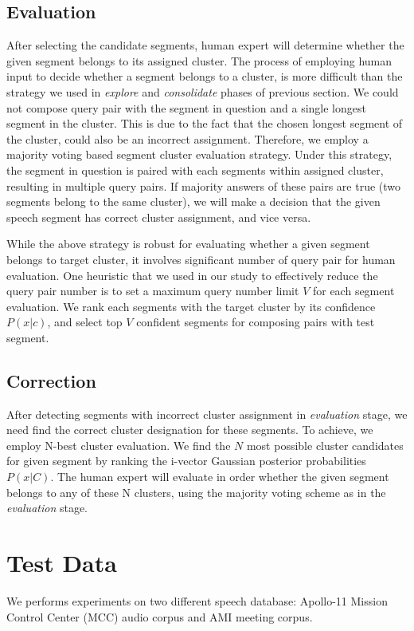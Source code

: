 \documentclass[journal]{IEEEtran}
\begin{document}
\subsection{Evaluation}
After selecting the candidate segments, human expert will determine whether the given segment belongs to its assigned cluster. The process of employing human input to decide whether a segment belongs to a cluster, is more difficult than the strategy we used in \textit{explore} and \textit{consolidate} phases of previous section. We could not compose query pair with the segment in question and a single longest segment in the cluster. This is due to the fact that the chosen longest segment of the cluster, could also be an incorrect assignment. Therefore, we employ a majority voting based segment cluster evaluation strategy. Under this strategy, the segment in question is paired with each segments within assigned cluster, resulting in multiple query pairs. If majority answers of these pairs are true (two segments belong to the same cluster), we will make a decision that the given speech segment has correct cluster assignment, and vice versa. 

While the above strategy is robust for evaluating whether a given segment belongs to target cluster, it involves significant number of query pair for human evaluation. One heuristic that we used in our study to effectively reduce the query pair number is to set a maximum query number limit $V$ for each segment evaluation. We rank each segments with the target cluster by its confidence $P(x|c)$, and select top $V$ confident segments for composing pairs with test segment. 

\subsection{Correction}
After detecting segments with incorrect cluster assignment in \textit{evaluation} stage, we need find the correct cluster designation for these segments. To achieve, we employ N-best cluster evaluation.
We find the $N$ most possible cluster candidates for given segment by ranking the i-vector Gaussian posterior probabilities $P(x|C)$. The human expert will evaluate in order whether the given segment belongs to any of these N clusters, using the majority voting scheme as in the \textit{evaluation} stage. 

\section{Test Data}
We performs experiments on two different speech database: Apollo-11 Mission Control Center (MCC) audio  corpus and AMI meeting corpus. 
\end{document}
